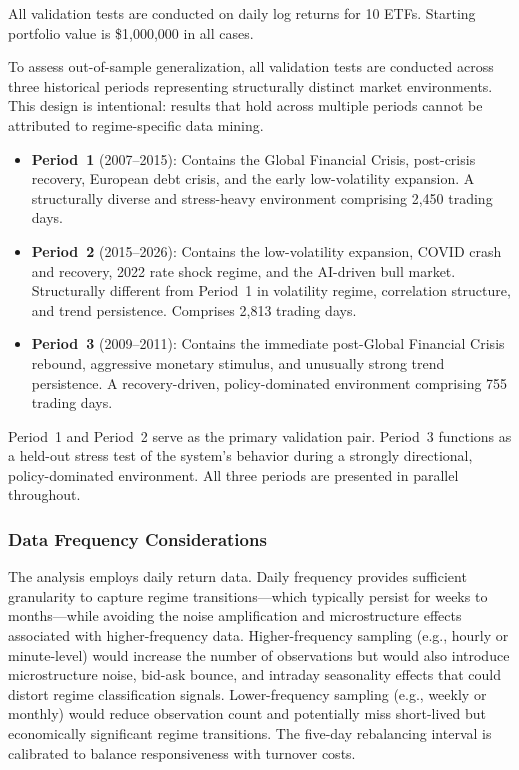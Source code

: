 \documentclass[12pt]{article}
\begin{document}
All validation tests are conducted on daily log returns for 10 ETFs.
Starting portfolio value is \$1,000,000 in all cases.

To assess out-of-sample generalization, all validation tests are conducted across three historical periods representing structurally distinct market environments.
This design is intentional: results that hold across multiple periods cannot be attributed to regime-specific data mining.

\begin{itemize}
    \item \textbf{Period~1} (2007--2015): Contains the Global Financial Crisis, post-crisis recovery, European debt crisis, and the early low-volatility expansion. A structurally diverse and stress-heavy environment comprising 2{,}450 trading days.

    \item \textbf{Period~2} (2015--2026): Contains the low-volatility expansion, COVID crash and recovery, 2022 rate shock regime, and the AI-driven bull market. Structurally different from Period~1 in volatility regime, correlation structure, and trend persistence. Comprises 2{,}813 trading days.

    \item \textbf{Period~3} (2009--2011): Contains the immediate post-Global Financial Crisis rebound, aggressive monetary stimulus, and unusually strong trend persistence. A recovery-driven, policy-dominated environment comprising 755 trading days.
\end{itemize}

\noindent
Period~1 and Period~2 serve as the primary validation pair.
Period~3 functions as a held-out stress test of the system's behavior during a strongly directional, policy-dominated environment.
All three periods are presented in parallel throughout.

\subsubsection{Data Frequency Considerations}

The analysis employs daily return data.
Daily frequency provides sufficient granularity to capture regime transitions---which typically persist for weeks to months---while avoiding the noise amplification and microstructure effects associated with higher-frequency data.
Higher-frequency sampling (e.g., hourly or minute-level) would increase the number of observations but would also introduce microstructure noise, bid-ask bounce, and intraday seasonality effects that could distort regime classification signals.
Lower-frequency sampling (e.g., weekly or monthly) would reduce observation count and potentially miss short-lived but economically significant regime transitions.
The five-day rebalancing interval is calibrated to balance responsiveness with turnover costs.
\end{document}
